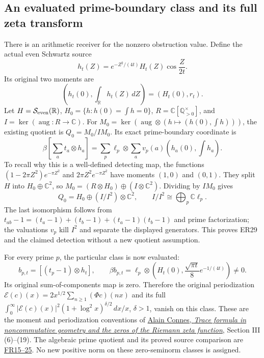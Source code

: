 \subsection{An evaluated prime-boundary class and its full zeta transform}

There is an arithmetic receiver for the nonzero obstruction value.
Define the actual even Schwartz source
\[
 h_t(Z)=e^{-Z^2/(4t)}H_t(Z)\cos\!\frac{Z}{2t}.
 \tag{ER27}
\]
Its original two moments are
\[
 \left(h_t(0),\int_{\mathbb R}h_t(Z)\,dZ\right)
           =(H_t(0),r_t).
 \tag{ER28}
\]
Let \(H=\mathcal S_{\rm even}(\mathbb R)\),
\(H_0=\{h:h(0)=\int h=0\}\),
\(R=\mathbb C[\mathbb Q_{>0}^{\times}]\), and
\(I=\ker(\operatorname{aug}:R\to\mathbb C)\).
For \(M_0=\ker(\operatorname{aug}\otimes(h\mapsto(h(0),\int h)))\),
the existing quotient is \(Q_0=M_0/IM_0\).
Its exact prime-boundary coordinate is
\[
 \beta\left[\sum_a t_a\otimes h_a\right]
  =\sum_p\ell_p\otimes\sum_a v_p(a)
                \left(h_a(0),\int h_a\right).
 \tag{ER29}
\]
To recall why this is a well-defined detecting map, the functions
\((1-2\pi Z^2)e^{-\pi Z^2}\) and \(2\pi Z^2e^{-\pi Z^2}\)
have moments \((1,0)\) and \((0,1)\). They split \(H\) into
\(H_0\oplus\mathbb C^2\), so
\(M_0=(R\otimes H_0)\oplus(I\otimes\mathbb C^2)\).
Dividing by \(IM_0\) gives
\[
 Q_0=H_0\oplus(I/I^2)\otimes\mathbb C^2,\qquad
 I/I^2\cong\bigoplus_p\mathbb C\ell_p.
\]
The last isomorphism follows from
\(t_{ab}-1=(t_a-1)+(t_b-1)+(t_a-1)(t_b-1)\)
and prime factorization; the valuations \(v_p\) kill \(I^2\)
and separate the displayed generators. This proves ER29 and
the claimed detection without a new quotient assumption.

For every prime \(p\), the particular class is now evaluated:
\[
 b_{p,t}=[(t_p-1)\otimes h_t],\qquad
 \boxed{\beta b_{p,t}=\ell_p\otimes
      \left(H_t(0),\frac{\sqrt{\pi t}}8e^{-1/(4t)}\right)\ne0.}
 \tag{ER30}
\]
Its original sum-of-components map is zero. Therefore the original
periodization
\(\mathcal E(c)(x)=2x^{1/2}\sum_{n\ge1}(\Phi c)(nx)\)
and its full
\(\int_0^\infty|\mathcal E(c)(x)|^2
 (1+\log^2x)^{\delta/2}\,dx/x\), \(\delta>1\),
vanish on this class. These are the moment and periodization
conventions of
\href{https://arxiv.org/abs/math/9811068v1}{Alain Connes,
\emph{Trace formula in noncommutative geometry and the zeros of the
Riemann zeta function}}, Section III (6)--(19).
The algebraic prime quotient and its proved source comparison are
\href{https://github.com/KokunoYumeto/zeta-function-research-reader/blob/ec73ac350d0cda3d95c0bd1361bede33166b4d34/workbenches/splitzero-tandem/continuations/20260923-original-zeta-return/NOTE.tex}{FR15--25}.
No new positive norm on these zero-seminorm classes is assigned.

